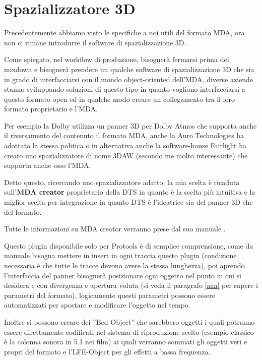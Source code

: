 \documentclass[12pt,a4paper]{report}
\begin{document}
\section{Spazializzatore 3D}

Precedentemente abbiamo visto le specifiche a noi utili del formato MDA, ora non ci rimane introdurre il software di spazializzazione 3D.

Come spiegato, nel workflow di produzione, bisognerà fermarsi prima del mixdown e bisognerà prendere un qualche software di spazializzazione 3D che sia in grado di interfacciarsi con il mondo object-oriented dell'MDA, diverse aziende stanno sviluppando soluzioni di questo tipo in quanto vogliono interfacciarsi a questo formato open ed in qualche modo creare un collegamento tra il loro formato proprietario e l'MDA.

Per esempio la Dolby utilizza un panner 3D per Dolby Atmos che supporta anche il riversamento del contenuto il formato MDA, anche la Auro Technologies ha adottato la stessa politica o in alternativa anche la software-house Fairlight ha creato uno spazializzatore di nome 3DAW (secondo me molto interessante) che supporta anche esso l'MDA.

Detto questo, ricercando uno spazializzatore adatto, la mia scelta è ricaduta sull'\textbf{MDA creator} proprietario della DTS in quanto è la scelta più intuitiva e la miglior scelta per integrazione in quanto DTS è l'ideatrice sia del panner 3D che del formato.

Tutte le informazioni su MDA creator verranno prese dal suo manuale \cite{creator}.

Questo plugin disponibile solo per Protools è di semplice comprensione, come da manuale bisogna mettere in insert in ogni traccia questo plugin (condizione necessaria è che tutte le tracce devono avere la stessa lunghezza), poi aprendo l'interfaccia del panner bisognerà posizionare ogni oggetto nel punto in cui si desidera e con divergenza e apertura voluta (si veda il paragrafo \ref{aaa} per sapere i parametri del formato), logicamente questi parametri possono essere automatizzati per spostare e modificare l'oggetto nel tempo.

Inoltre si possono creare dei ''Bed Object'' che sarebbero oggetti i quali potranno essere direttamente codificati nel sistema di riproduzione scelto (esempio classico è la colonna sonora in 5.1 nei film) ai quali verranno sommati gli oggetti veri e propri del formato e l'LFE-Object per gli effetti a bassa frequenza.
\end{document}
